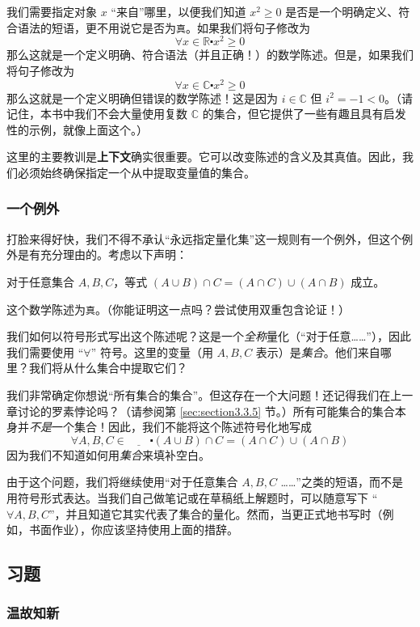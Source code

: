我们需要指定对象 $x$ ``来自''哪里，以便我们知道 $x^2 \ge 0$ 是否是一个明确定义、符合语法的短语，更不用说它是否为\verb|真|。如果我们将句子修改为
\[\forall x \in \mathbb{R} \centerdot x^2 \ge 0\]
那么这就是一个定义明确、符合语法（并且正确！）的数学陈述。但是，如果我们将句子修改为
\[\forall x \in \mathbb{C} \centerdot x^2 \ge 0\]
那么这就是一个定义明确但错误的数学陈述！这是因为 $i \in \mathbb{C}$ 但 $i^2 = -1 < 0$。（请记住，本书中我们不会大量使用复数 $\mathbb{C}$ 的集合，但它提供了一些有趣且具有启发性的示例，就像上面这个。）

这里的主要教训是\textbf{上下文}确实很重要。它可以改变陈述的含义及其真值。因此，我们必须始终确保指定一个从中提取变量值的集合。

\subsubsection*{一个例外}

打脸来得好快，我们不得不承认``永远指定量化集''这一规则有一个例外，但这个例外是有充分理由的。考虑以下声明：
\begin{center}
    对于任意集合 $A, B,C$，等式 $(A \cup B) \cap C = (A \cap C) \cup (A \cap B)$ 成立。
\end{center}
这个数学陈述为\verb|真|。（你能证明这一点吗？尝试使用双重包含论证！）

我们如何以符号形式写出这个陈述呢？这是一个\emph{全称}量化（``对于任意……''），因此我们需要使用 ``$\forall$'' 符号。这里的变量（用 $A,B,C$ 表示）是\emph{集合}。他们来自哪里？我们将从什么集合中提取它们？

我们非常确定你想说``所有集合的集合''。但这存在一个大问题！还记得我们在上一章讨论的罗素悖论吗？（请参阅第 \ref{sec:section3.3.5} 节。）所有可能集合的集合本身并\emph{不是}一个集合！因此，我们不能将这个陈述符号化地写成
\[\forall A, B,C \in \underline{\qquad} \centerdot (A \cup B) \cap C = (A \cap C) \cup (A \cap B)\]
因为我们不知道如何用\emph{集合}来填补空白。

由于这个问题，我们将继续使用``对于任意集合 $A,B,C$ ……''之类的短语，而不是用符号形式表达。当我们自己做笔记或在草稿纸上解题时，可以随意写下 ``$\forall A,B,C$''，并且知道它其实代表了集合的量化。然而，当更正式地书写时（例如，书面作业），你应该坚持使用上面的措辞。

\subsection{习题}

\subsubsection*{温故知新}


